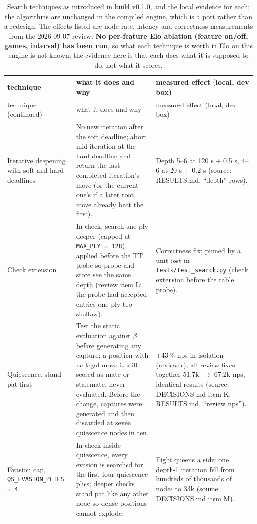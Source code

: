 \documentclass[11pt,a4paper]{article}
\newcommand{\src}[1]{{\small(source: #1)}}
\newcommand{\code}[1]{\texttt{#1}}
\begin{document}
{\footnotesize
\begin{longtable}{@{}>{\raggedright\arraybackslash}p{3.4cm}>{\raggedright\arraybackslash}p{5.2cm}>{\raggedright\arraybackslash}p{5.9cm}@{}}
\caption{Search techniques as introduced in build v0.1.0, and the local evidence for each; the algorithms
are unchanged in the compiled engine, which is a port rather than a redesign. The effects listed are
node-rate, latency and correctness measurements from the 2026-09-07 review. \textbf{No per-feature Elo
ablation (feature on/off, games, interval) has been run}, so what each technique is worth in Elo on this
engine is not known; the evidence here is that each does what it is supposed to do, not what it
scores.}\label{tab:search}\\
\toprule
technique & what it does and why & measured effect (local, dev box) \\
\midrule
\endfirsthead
\toprule
technique (continued) & what it does and why & measured effect (local, dev box) \\
\midrule
\endhead
\bottomrule
\endlastfoot
Iterative deepening with soft and hard deadlines & No new iteration after the soft deadline; abort mid-iteration at the hard deadline and return the last completed iteration's move (or the current one's if a later root move already beat the first). & Depth 5--6 at 120 s + 0.5 s, 4--6 at 20 s + 0.2 s \src{RESULTS.md, ``depth'' rows}. \\
Check extension & In check, search one ply deeper (capped at \code{MAX\_PLY = 128}), applied before the TT probe so probe and store see the same depth (review item L: the probe had accepted entries one ply too shallow). & Correctness fix; pinned by a unit test in \code{tests/test\_search.py} (check extension before the table probe). \\
Quiescence, stand pat first & Test the static evaluation against $\beta$ before generating any capture; a position with no legal move is still scored as mate or stalemate, never evaluated. Before the change, captures were generated and then discarded at seven quiescence nodes in ten. & +43\,\% nps in isolation (reviewer); all review fixes together 51.7k $\to$ 67.2k nps, identical results \src{DECISIONS.md item K; RESULTS.md, ``review nps''}. \\
Evasion cap, \code{QS\_EVASION\_PLIES = 4} & In check inside quiescence, every evasion is searched for the first four quiescence plies; deeper checks stand pat like any other node so dense positions cannot explode. & Eight queens a side: one depth-1 iteration fell from hundreds of thousands of nodes to 33k \src{DECISIONS.md item M}. \\

\end{longtable}}
\end{document}
